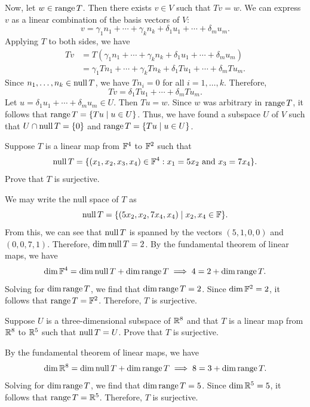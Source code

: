 \begin{exc}
\begin{solution}
Now, let $w\in\operatorname{range} T$. Then there exists $v\in V$ such that $Tv=w$. We can
express $v$ as a linear combination of the basis vectors of $V$:
\[ v=\gamma_1n_1+\cdots+\gamma_kn_k+\delta_1u_1+\cdots+\delta_mu_m. \]
Applying $T$ to both sides, we have
\begin{align*}
Tv &= T(\gamma_1n_1+\cdots+\gamma_kn_k+\delta_1u_1+\cdots+\delta_mu_m)\\
   &= \gamma_1Tn_1+\cdots+\gamma_kTn_k+\delta_1Tu_1+\cdots+\delta_mTu_m.
\end{align*}
Since $n_1,\dots,n_k\in\operatorname{null} T$, we have $Tn_i=0$ for all $i=1,\dots,k$.
Therefore,
\[ Tv=\delta_1Tu_1+\cdots+\delta_mTu_m. \]
Let $u=\delta_1u_1+\cdots+\delta_mu_m\in U$. Then $Tu=w$. Since $w$ was
arbitrary in $\operatorname{range} T$, it follows that $\operatorname{range} T=\{Tu\mid u\in U\}$. Thus,
we have found a subspace $U$ of $V$ such that $U\cap\operatorname{null} T=\{0\}$ and
$\operatorname{range} T=\{Tu\mid u\in U\}$.
\end{solution}

\begin{exercise}
Suppose $T$ is a linear map from $\mathbb{F}^4$ to $\mathbb{F}^2$ such that
\[ \operatorname{null} T=\{(x_1,x_2,x_3,x_4)\in\mathbb{F}^4 : x_1=5x_2 \text{ and } x_3=7x_4\}. \]
Prove that $T$ is surjective.
\end{exercise}
\begin{solution}
We may write the null space of $T$ as
\[ \operatorname{null} T=\{(5x_2,x_2,7x_4,x_4)\mid x_2,x_4\in\mathbb{F}\}. \]
From this, we can see that $\operatorname{null} T$ is spanned by the vectors $(5,1,0,0)$ and
$(0,0,7,1)$. Therefore, $\operatorname{dim}\operatorname{null} T=2$. By the fundamental theorem of linear
maps, we have
\[ \operatorname{dim}\mathbb{F}^4=\operatorname{dim}\operatorname{null} T+\operatorname{dim}\operatorname{range} T\implies4=2+\operatorname{dim}\operatorname{range} T. \]
Solving for $\operatorname{dim}\operatorname{range} T$, we find that $\operatorname{dim}\operatorname{range} T=2$. Since
$\operatorname{dim}\mathbb{F}^2=2$, it follows that $\operatorname{range} T=\mathbb{F}^2$. Therefore, $T$ is surjective.
\end{solution}

\begin{exercise}
Suppose $U$ is a three-dimensional subspace of $\mathbb{R}^8$ and that $T$ is a
linear map from $\mathbb{R}^8$ to $\mathbb{R}^5$ such that $\operatorname{null} T=U$. Prove that $T$ is
surjective.
\end{exercise}
\begin{solution}
By the fundamental theorem of linear maps, we have
\[ \operatorname{dim}\mathbb{R}^8=\operatorname{dim}\operatorname{null} T+\operatorname{dim}\operatorname{range} T\implies8=3+\operatorname{dim}\operatorname{range} T. \]
Solving for $\operatorname{dim}\operatorname{range} T$, we find that $\operatorname{dim}\operatorname{range} T=5$. Since
$\operatorname{dim}\mathbb{R}^5=5$, it follows that $\operatorname{range} T=\mathbb{R}^5$. Therefore, $T$ is surjective.
\end{solution}


\end{exc}
